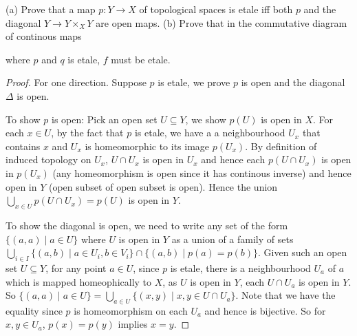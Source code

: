 \documentclass[a4paper]{article}
\begin{document}
\begin{question}
    (a) Prove that a map $p:Y\to X$ of topological spaces is etale iff both $p$ and the diagonal $Y\to Y\times_X Y$ are open maps.\newline
    (b) Prove that in the commutative diagram of continous maps
    \begin{center}
    \end{center}
    where $p$ and $q$ is etale, $f$ must be etale.
\end{question}
\begin{proof}
    For one direction. Suppose $p$ is etale, we prove $p$ is open and the diagonal $\Delta$ is open. 
    
    To show $p$ is open: Pick an open set $U\subseteq Y$, we show $p(U)$ is open in $X$. For each $x\in U$, by the fact that $p$ is etale, we have a a neighbourhood $U_x$ that contains $x$ and $U_x$ is homeomorphic to its image $p(U_x)$. By definition of induced topology on $U_x$, $U\cap U_x$ is open in $U_x$ and hence each $p(U\cap U_x)$ is open in $p(U_x)$ (any homeomorphism is open since it has continous inverse) and hence open in $Y$ (open subset of open subset is open). Hence the union $\bigcup_{x\in U}p(U\cap U_x)=p(U)$ is open in $Y$.

    To show the diagonal is open, we need to write any set of the form $\{(a,a)\mid a \in U\}$ where $U$ is open in $Y$ as a union of a family of sets $\bigcup_{i\in I}\{(a,b)\mid a \in U_i,b \in V_i\}\cap \{(a,b)\mid p(a)=p(b)\}$. Given such an open set $U\subseteq Y$, for any point $a\in U$, since $p$ is etale, there is a neighbourhood $U_a$ of $a$ which is mapped homeophically to $X$, as $U$ is open in $Y$, each $U\cap U_a$ is open in $Y$. So $\{(a,a)\mid a\in U\}=\bigcup_{a\in U}\{(x,y)\mid x,y\in U\cap U_a\}$. Note that we have the equality since $p$ is homeomorphism on each $U_a$ and hence is bijective. So for $x,y\in U_a$, $p(x)=p(y)$ implies $x=y$. 



\end{proof}
\end{document}
